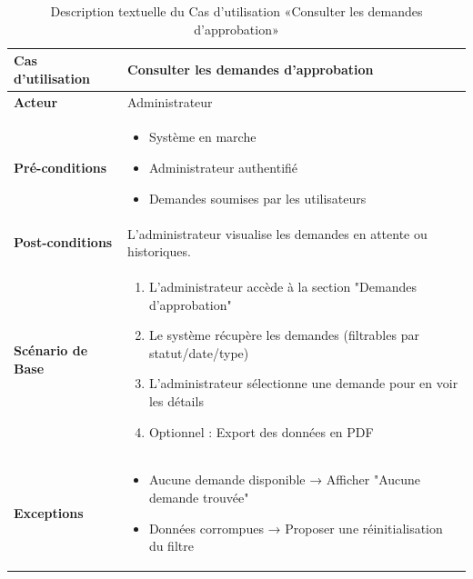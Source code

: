 \begin{table}[!ht]
    \vspace{-1.5cm}
    \begin{adjustwidth}{-2cm}{-2cm}
    \centering
    \caption{Description textuelle du Cas d'utilisation «Consulter les demandes d'approbation»}
    \label{tab:cdapp}
    \renewcommand{\arraystretch}{1.2}
    \begin{tabular}{|p{4.2cm}|p{13cm}|}
    \hline
    \textbf{Cas d'utilisation} & Consulter les demandes d'approbation \\
    \hline
    \textbf{Acteur} & Administrateur \\
    \hline
    \textbf{Pré-conditions} & 
    \begin{itemize}
    \item Système en marche
    \item Administrateur authentifié
    \item Demandes soumises par les utilisateurs
    \end{itemize} \\
    \hline
    \textbf{Post-conditions} & L'administrateur visualise les demandes en attente ou historiques. \\
    \hline
    \textbf{Scénario de Base} & 
    \begin{enumerate}
    \item L'administrateur accède à la section "Demandes d'approbation"
    \item Le système récupère les demandes (filtrables par statut/date/type)
    \item L'administrateur sélectionne une demande pour en voir les détails
    \item Optionnel : Export des données en PDF
    \end{enumerate} \\
    \hline
    \textbf{Exceptions} & 
    \begin{itemize}
    \item Aucune demande disponible → Afficher "Aucune demande trouvée"
    \item Données corrompues → Proposer une réinitialisation du filtre
    \end{itemize} \\
    \hline
    \end{tabular}
    \end{adjustwidth}
    \end{table}

